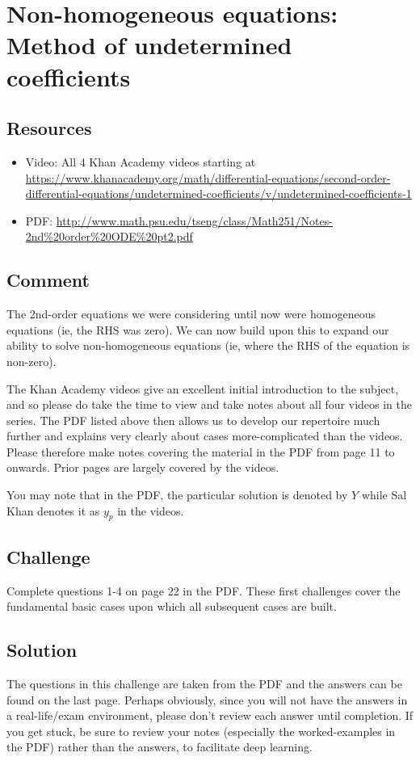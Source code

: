 \newpage
\section{Non-homogeneous equations: Method of undetermined coefficients}

\subsection*{Resources}
\begin{itemize}
    \item Video: All 4 Khan Academy videos starting at \url{https://www.khanacademy.org/math/differential-equations/second-order-differential-equations/undetermined-coefficients/v/undetermined-coefficients-1}
    \item PDF: \url{http://www.math.psu.edu/tseng/class/Math251/Notes-2nd\%20order\%20ODE\%20pt2.pdf}
\end{itemize}

\subsection*{Comment}
The 2nd-order equations we were considering until now were homogeneous equations (ie, the RHS was zero). We can now build upon this to expand our ability to solve non-homogeneous equations (ie, where the RHS of the equation is non-zero).

The Khan Academy videos give an excellent initial introduction to the subject, and so please do take the time to view and take notes about all four videos in the series. The PDF listed above then allows us to develop our repertoire much further and explains very clearly about cases more-complicated than the videos. Please therefore make notes covering the material in the PDF from page 11 to onwards. Prior pages are largely covered by the videos.

You may note that in the PDF, the particular solution is denoted by $Y$ while Sal Khan denotes it as $y_p$ in the videos.

\subsection*{Challenge}
Complete questions 1-4 on page 22 in the PDF. These first challenges cover the fundamental basic cases upon which all subsequent cases are built.

\subsection*{Solution}
The questions in this challenge are taken from the PDF and the answers can be found on the last page. Perhaps obviously, since you will not have the answers in a real-life/exam environment, please don't review each answer until completion. If you get stuck, be sure to review your notes (especially the worked-examples in the PDF) rather than the answers, to facilitate deep learning. 




